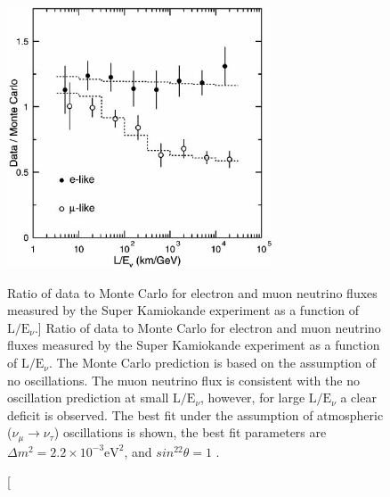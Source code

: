 \begin{figure}

	\centering

	\includegraphics[width=0.7\textwidth]{figures/sk_flux.jpg}

	\caption
	[Ratio of data to Monte Carlo for electron and muon neutrino fluxes 
	measured by the Super Kamiokande experiment as a function of 
	\(\mbox{L} / \mbox{E}_\nu\).]
	{Ratio of data to Monte Carlo for electron and muon neutrino fluxes measured 
	by the Super Kamiokande experiment as a function of 
	\(\mbox{L} / \mbox{E}_\nu\). The Monte Carlo prediction is based on the
	assumption of no oscillations. The muon neutrino flux is consistent with the
	no oscillation prediction at small \(\mbox{L} / \mbox{E}_\nu\), however, for
	large \(\mbox{L} / \mbox{E}_\nu\) a clear deficit is observed. The best fit
	under the assumption of atmospheric (\(\nu_\mu \rightarrow \nu_\tau\))
	oscillations is shown, the best fit parameters are \(\Delta m^2 = 2.2 \times
	10^{-3} \mbox{eV}^2\), and \(sin^22\theta = 1\) \cite{Fukuda1998}.}

	\label{fig:sk_flux}

\end{figure}

